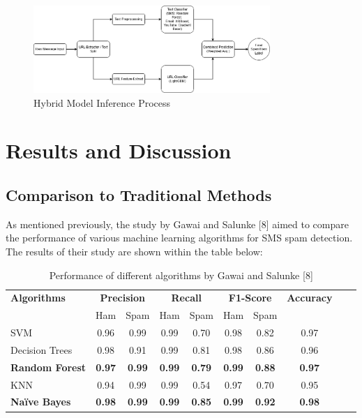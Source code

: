 \documentclass{article}
\begin{document}
\begin{figure}[htbp]
    \centering
    \includegraphics[width=0.8\textwidth]{../analysis/Model_Pipeline_Flowchart.png}
    \caption{Hybrid Model Inference Process}
    \label{fig:inference_process}
\end{figure}

\section{Results and Discussion}
\subsection{Comparison to Traditional Methods}

\noindent
As mentioned previously, the study by Gawai and Salunke [8] aimed to compare the performance of various machine learning algorithms for SMS spam detection. The results of their study are shown within the table below:

\begin{table}[htbp]
    \centering
    \caption{Performance of different algorithms by Gawai and Salunke [8]} %
    \label{tab:performance} %
    
    \begin{tabular}{l cccc cccc c}
    \toprule
    \textbf{Algorithms} & \multicolumn{2}{c}{\textbf{Precision}} & \multicolumn{2}{c}{\textbf{Recall}} & \multicolumn{2}{c}{\textbf{F1-Score}} & \textbf{Accuracy} \\
    \cmidrule(lr){2-3} \cmidrule(lr){4-5} \cmidrule(lr){6-7}
    & Ham & Spam & Ham & Spam & Ham & Spam & \\
    \midrule
    SVM & 0.96 & 0.99 & 0.99 & 0.70 & 0.98 & 0.82 & 0.97 \\
    Decision Trees & 0.98 & 0.91 & 0.99 & 0.81 & 0.98 & 0.86 & 0.96 \\
    \textbf{Random Forest} & \textbf{0.97} & \textbf{0.99} & \textbf{0.99} & \textbf{0.79} & \textbf{0.99} & \textbf{0.88} & \textbf{0.97} \\
    KNN & 0.94 & 0.99 & 0.99 & 0.54 & 0.97 & 0.70 & 0.95 \\
    \textbf{Naïve Bayes} & \textbf{0.98} & \textbf{0.99} & \textbf{0.99} & \textbf{0.85} & \textbf{0.99} & \textbf{0.92} & \textbf{0.98} \\
    \bottomrule
    \end{tabular}
\end{table}
\end{document}
